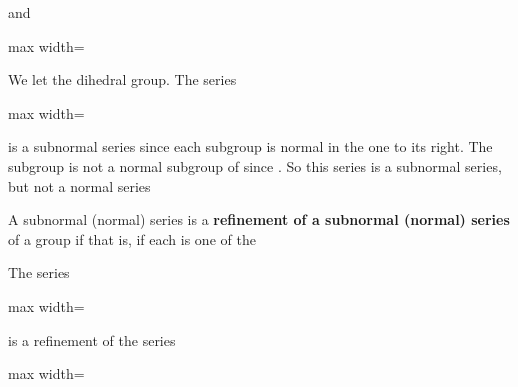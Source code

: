 \documentclass[11pt,oneside]{article}
\begin{document}
\begin{BookBody}
\noindent and

\begin{center}\begin{adjustbox}{max width=\linewidth}\end{adjustbox}\end{center} \BookEnd{\blacktriangle}

 We let  the dihedral group. The series

\begin{center}\begin{adjustbox}{max width=\linewidth}\end{adjustbox}\end{center}

\noindent is a subnormal series since each subgroup is normal in the one to its right. The subgroup \BookInline{\{\iota,\allowbreak \mu \}} is not a normal subgroup of  since . So this series is a subnormal series, but not a normal series\BookEnd{\blacktriangle}

 A subnormal (normal) series  is a\textbf{ refinement of a subnormal (normal) series}  of a group  if  that is, if each  is one of the \BookEnd{\blacksquare}

 The series

\begin{center}\begin{adjustbox}{max width=\linewidth}\end{adjustbox}\end{center}

\noindent is a refinement of the series

\begin{center}\begin{adjustbox}{max width=\linewidth}\end{adjustbox}\end{center}


\end{BookBody}
\end{document}
